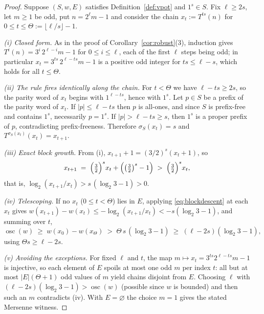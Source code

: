 \documentclass[11pt]{amsart}
\theoremstyle{definition}
\theoremstyle{remark}
\begin{document}
\begin{proof}
Suppose $(S, w, E)$ satisfies Definition~\ref{def:vpot} and $1^s \in S$. Fix $\ell \ge 2s$, let $m \ge 1$ be odd, put $n = 2^\ell m - 1$ and consider the chain $x_t := T^{ts}(n)$ for $0 \le t \le \Theta := \lfloor \ell/s \rfloor - 1$.

\emph{(i) Closed form.} As in the proof of Corollary~\ref{cor:robust}(3), induction gives $T^{i}(n) = 3^{i}\,2^{\ell-i} m - 1$ for $0 \le i \le \ell$, each of the first $\ell$ steps being odd; in particular $x_t = 3^{ts}\,2^{\ell-ts}m - 1$ is a positive odd integer for $ts \le \ell - s$, which holds for all $t \le \Theta$.

\emph{(ii) The rule fires identically along the chain.} For $t < \Theta$ we have $\ell - ts \ge 2s$, so the parity word of $x_t$ begins with $1^{\ell - ts}$, hence with $1^s$. Let $p \in S$ be a prefix of the parity word of $x_t$. If $|p| \le \ell - ts$ then $p$ is all-ones, and since $S$ is prefix-free and contains $1^s$, necessarily $p = 1^s$. If $|p| > \ell - ts \ge s$, then $1^s$ is a proper prefix of $p$, contradicting prefix-freeness. Therefore $\sigma_S(x_t) = s$ and $T^{\sigma_S(x_t)}(x_t) = x_{t+1}$.

\emph{(iii) Exact block growth.} From (i), $x_{t+1} + 1 = (3/2)^s (x_t + 1)$, so
\[
x_{t+1} \;=\; \Bigl(\tfrac32\Bigr)^{s} x_t + \Bigl(\bigl(\tfrac32\bigr)^{s} - 1\Bigr) \;>\; \Bigl(\tfrac32\Bigr)^{s} x_t ,
\]
that is, $\log_2 (x_{t+1}/x_t) > s\,(\log_2 3 - 1) > 0$.

\emph{(iv) Telescoping.} If no $x_t$ ($0 \le t < \Theta$) lies in $E$, applying \eqref{eq:blockdescent} at each $x_t$ gives $w(x_{t+1}) - w(x_t) \le -\log_2 (x_{t+1}/x_t) < -s(\log_2 3 - 1)$, and summing over $t$,
\[
\operatorname{osc}(w) \;\ge\; w(x_0) - w(x_\Theta) \;>\; \Theta\, s\,(\log_2 3 - 1) \;\ge\; (\ell - 2s)(\log_2 3 - 1),
\]
using $\Theta s \ge \ell - 2s$.

\emph{(v) Avoiding the exceptions.} For fixed $\ell$ and $t$, the map $m \mapsto x_t = 3^{ts}2^{\ell-ts}m - 1$ is injective, so each element of $E$ spoils at most one odd $m$ per index $t$: all but at most $|E|(\Theta + 1)$ odd values of $m$ yield chains disjoint from $E$. Choosing $\ell$ with $(\ell - 2s)(\log_2 3 - 1) > \operatorname{osc}(w)$ (possible since $w$ is bounded) and then such an $m$ contradicts (iv). With $E = \varnothing$ the choice $m = 1$ gives the stated Mersenne witness.
\end{proof}
\end{document}
